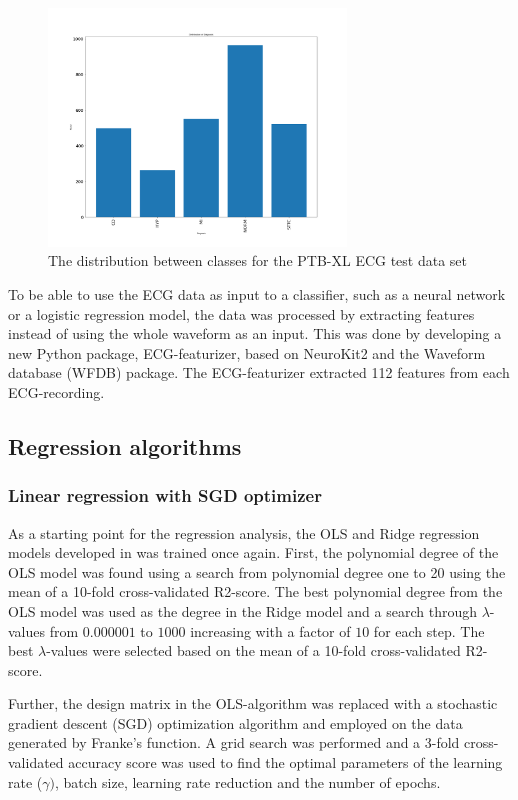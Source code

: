 \documentclass[twocolumn]{cinc}
\begin{document}
\begin{figure}[!htb]
\includegraphics[width=7.9cm]{Figures/distribution_test.png}
\caption{The distribution between classes for the PTB-XL ECG test data set}
\label{fig:ECGtest}
\end{figure}

To be able to use the ECG data as input to a classifier, such as a neural network or a logistic regression model, the data was processed by extracting features instead of using the whole waveform as an input. This was done by developing a new Python package, ECG-featurizer\cite{bjorn-jostein_singstad_ecg-featurizer_nodate}, based on NeuroKit2 \cite{makowski_neurokit2_2020} and the Waveform database (WFDB) package. The ECG-featurizer extracted 112 features from each ECG-recording.


\subsection{Regression algorithms}
\subsubsection{Linear regression with SGD optimizer}
As a starting point for the regression analysis, the OLS and Ridge regression models developed in \cite{bjorn-jostein_singstad_using_nodate} was trained once again. First, the polynomial degree of the OLS model was found using a search from polynomial degree one to 20 using the mean of a 10-fold cross-validated R2-score.
The best polynomial degree from the OLS model was used as the degree in the Ridge model and a search through $\lambda$-values from $0.000001$ to $1000$ increasing with a factor of $10$ for each step. The best $\lambda$-values were selected based on the mean of a 10-fold cross-validated R2-score.

Further, the design matrix in the OLS-algorithm was replaced with a stochastic gradient descent (SGD) optimization algorithm and employed on the data generated by Franke's function. A grid search was performed and a 3-fold cross-validated accuracy score was used to find the optimal parameters of the learning rate ($\gamma)$, batch size, learning rate reduction and the number of epochs.
\end{document}
